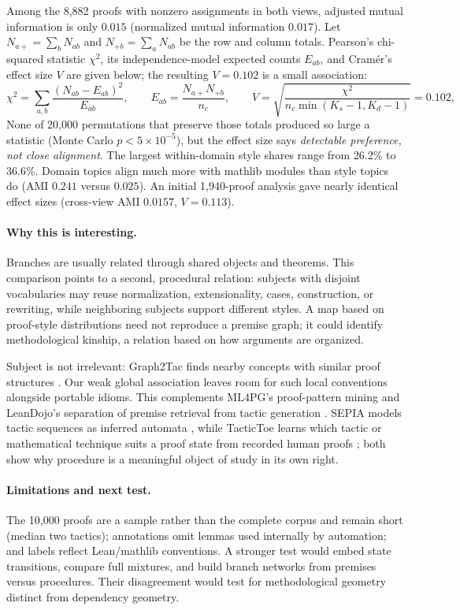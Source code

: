 \documentclass[11pt]{article}
\begin{document}
Among the 8,882 proofs with nonzero assignments in both views, adjusted mutual information is
only $0.015$ (normalized mutual information $0.017$).
\newpage
Let
$N_{a+}=\sum_bN_{ab}$ and $N_{+b}=\sum_aN_{ab}$ be the row and column totals.  Pearson's
chi-squared statistic $\chi^2$, its independence-model expected counts $E_{ab}$, and
Cram\'er's effect size $V$ are given below; the resulting $V=0.102$ is a small association:
\[
 \chi^2=\sum_{a,b}\frac{(N_{ab}-E_{ab})^2}{E_{ab}},\qquad
 E_{ab}=\frac{N_{a+}N_{+b}}{n_c},\qquad
 V=\sqrt{\frac{\chi^2}{n_c\min(K_s-1,K_d-1)}}=0.102,
\]
None of 20,000 permutations that preserve those totals produced so
large a statistic (Monte Carlo $p<5\times10^{-5}$), but the effect size says
\emph{detectable preference, not close alignment}.  The largest within-domain style shares
range from 26.2\% to 36.6\%.  Domain topics align much more with mathlib modules than style
topics do (AMI $0.241$ versus $0.025$).  An initial 1,940-proof analysis gave nearly identical
effect sizes (cross-view AMI $0.0157$, $V=0.113$).

\paragraph{Why this is interesting.}
Branches are usually related through shared objects and theorems.  This comparison points to a
second, procedural relation: subjects with disjoint vocabularies may reuse normalization,
extensionality, cases, construction, or rewriting, while neighboring subjects support different
styles.  A map based on proof-style distributions need not reproduce a premise graph; it could
identify methodological kinship, a relation based on how arguments are organized.

Subject is not irrelevant: Graph2Tac finds nearby concepts with similar proof structures
\cite{graph2tac}.  Our weak global association leaves room for such local conventions alongside
portable idioms.  This complements ML4PG's proof-pattern mining \cite{ml4pg,patterns} and
LeanDojo's separation of premise retrieval from tactic generation \cite{leandojo}.  SEPIA
models tactic sequences as inferred automata \cite{sepia}, while TacticToe learns which tactic
or mathematical technique suits a proof state from recorded human proofs \cite{tactictoe}; both
show why procedure is a meaningful object of study in its own right.

\paragraph{Limitations and next test.}
The 10,000 proofs are a sample rather than the complete corpus and remain short (median two
tactics); annotations omit lemmas used internally by automation;
and labels reflect Lean/mathlib conventions.  A stronger test would embed state transitions,
compare full mixtures, and build branch networks from premises versus procedures.  Their
disagreement would test for methodological geometry distinct from dependency geometry.
\end{document}
